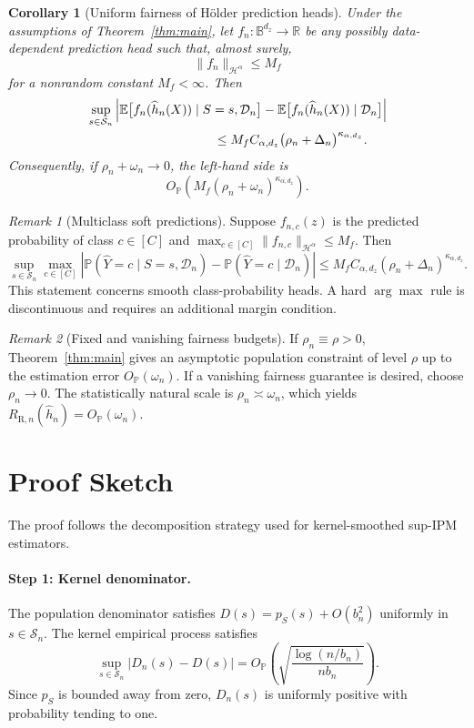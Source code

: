 \documentclass[11pt]{article}
\newtheorem{corollary}[theorem]{Corollary}
\theoremstyle{remark}
\newtheorem{remark}{Remark}[section]
\newcommand{\R}{\mathbb{R}}
\newcommand{\E}{\mathbb{E}}
\newcommand{\Pp}{\mathbb{P}}
\newcommand{\cS}{\mathcal{S}}
\newcommand{\cH}{\mathcal{H}}
\newcommand{\cD}{\mathcal{D}}
\newcommand{\cB}{\mathbb{B}}
\newcommand{\wh}{\widehat}
\begin{document}
\begin{corollary}[Uniform fairness of H\"older prediction heads]
\label{cor:prediction-head}
Under the assumptions of Theorem~\ref{thm:main}, let $f_n:\cB^{d_z}\to\R$
be any possibly data-dependent prediction head such that, almost surely,
\[
  \|f_n\|_{\cH^\alpha}\le M_f
\]
for a nonrandom constant $M_f<\infty$.  Then
\begin{align}
  &\sup_{s\in\cS_n}
  \left|
    \E\bigl[f_n(\wh h_n(X))\mid S=s,\cD_n\bigr]
    -
    \E\bigl[f_n(\wh h_n(X))\mid\cD_n\bigr]
  \right|
  \notag\\
  &\hspace{35mm}\le
  M_f C_{\alpha,d_z}
  \bigl(\rho_n+\Delta_n\bigr)^{\kappa_{\alpha,d_z}}.
  \label{eq:prediction-head-pathwise}
\end{align}
Consequently, if $\rho_n+\omega_n\to0$, the left-hand side is
\[
  O_{\Pp}\!\left(
    M_f(\rho_n+\omega_n)^{\kappa_{\alpha,d_z}}
  \right).
\]
\end{corollary}

\begin{remark}[Multiclass soft predictions]
Suppose $f_{n,c}(z)$ is the predicted probability of class $c\in[C]$ and
$\max_{c\in[C]}\|f_{n,c}\|_{\cH^\alpha}\le M_f$.  Then
\[
  \sup_{s\in\cS_n}\max_{c\in[C]}
  \left|
    \Pp(\wh Y=c\mid S=s,\cD_n)
    -
    \Pp(\wh Y=c\mid\cD_n)
  \right|
  \le
  M_f C_{\alpha,d_z}
  (\rho_n+\Delta_n)^{\kappa_{\alpha,d_z}}.
\]
This statement concerns smooth class-probability heads.  A hard $\arg\max$ rule
is discontinuous and requires an additional margin condition.
\end{remark}

\begin{remark}[Fixed and vanishing fairness budgets]
If $\rho_n\equiv\rho>0$, Theorem~\ref{thm:main} gives an asymptotic population
constraint of level $\rho$ up to the estimation error $O_{\Pp}(\omega_n)$.  If a
vanishing fairness guarantee is desired, choose $\rho_n\to0$.  The statistically
natural scale is $\rho_n\asymp\omega_n$, which yields
$R_{\mathrm{R},n}(\wh h_n)=O_{\Pp}(\omega_n)$.
\end{remark}

\section{Proof Sketch}

The proof follows the decomposition strategy used for kernel-smoothed sup-IPM
estimators.

\paragraph{Step 1: Kernel denominator.}
The population denominator satisfies
$D(s)=p_S(s)+O(b_n^2)$ uniformly in $s\in\cS_n$.  The kernel empirical process
satisfies
\[
  \sup_{s\in\cS_n}|D_n(s)-D(s)|
  =
  O_{\Pp}\!\left(
    \sqrt{\frac{\log(n/b_n)}{nb_n}}
  \right).
\]
Since $p_S$ is bounded away from zero, $D_n(s)$ is uniformly positive with
probability tending to one.
\end{document}
